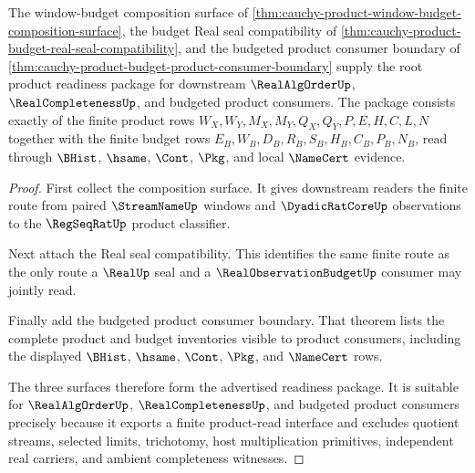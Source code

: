 \begin{theorem}
\label{thm:cauchy-product-root-product-readiness-package}
The window-budget composition surface of \autoref{thm:cauchy-product-window-budget-composition-surface}, the budget Real seal compatibility of \autoref{thm:cauchy-product-budget-real-seal-compatibility}, and the budgeted product consumer boundary of \autoref{thm:cauchy-product-budget-product-consumer-boundary} supply the root product readiness package for downstream $\RealAlgOrderUp$, $\RealCompletenessUp$, and budgeted product consumers. The package consists exactly of the finite product rows $W_X,W_Y,M_X,M_Y,Q_X,Q_Y,P,E,H,C,L,N$ together with the finite budget rows $E_B,W_B,D_B,R_B,S_B,H_B,C_B,P_B,N_B$, read through $\BHist$, $\hsame$, $\Cont$, $\Pkg$, and local $\NameCert$ evidence.
\end{theorem}
\begin{proof}
First collect the composition surface. It gives downstream readers the finite route from paired $\StreamNameUp$ windows and $\DyadicRatCoreUp$ observations to the $\RegSeqRatUp$ product classifier.

Next attach the Real seal compatibility. This identifies the same finite route as the only route a $\RealUp$ seal and a $\RealObservationBudgetUp$ consumer may jointly read.

Finally add the budgeted product consumer boundary. That theorem lists the complete product and budget inventories visible to product consumers, including the displayed $\BHist$, $\hsame$, $\Cont$, $\Pkg$, and $\NameCert$ rows.

The three surfaces therefore form the advertised readiness package. It is suitable for $\RealAlgOrderUp$, $\RealCompletenessUp$, and budgeted product consumers precisely because it exports a finite product-read interface and excludes quotient streams, selected limits, trichotomy, host multiplication primitives, independent real carriers, and ambient completeness witnesses.
\end{proof}

